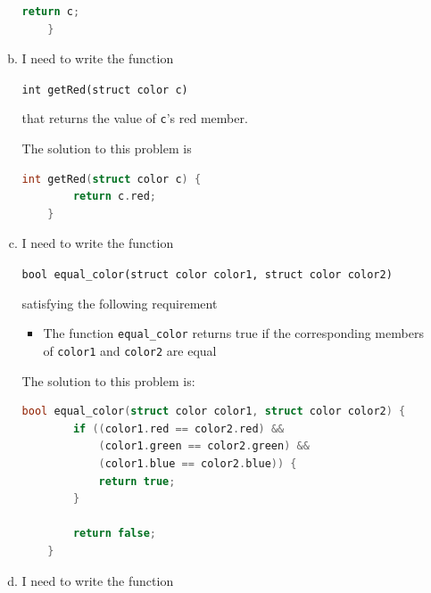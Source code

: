 \documentclass[12pt]{article}
\begin{document}
\begin{enumerate}[1.]
\begin{enumerate}[a)]
\begin{lstlisting}[language=c]
        return c;
    }
\end{lstlisting}

        \item

        I need to write the function

        \bigskip

        \texttt{int getRed(struct color c)}

        \bigskip

        that returns the value of \texttt{c}'s red member.

        \bigskip

        The solution to this problem is

\begin{lstlisting}[language=c]
    int getRed(struct color c) {
        return c.red;
    }
\end{lstlisting}

        \item

        I need to write the function

        \bigskip

        \texttt{bool equal\_color(struct color color1, struct color color2)}

        \bigskip

        satisfying the following requirement

        \begin{itemize}
            \item The function \texttt{equal\_color} returns true if the corresponding members of
            \texttt{color1} and \texttt{color2} are equal
        \end{itemize}

        \bigskip

        The solution to this problem is:

        \bigskip

\begin{lstlisting}[language=c]
    bool equal_color(struct color color1, struct color color2) {
        if ((color1.red == color2.red) &&
            (color1.green == color2.green) &&
            (color1.blue == color2.blue)) {
            return true;
        }

        return false;
    }
\end{lstlisting}

        \item

        I need to write the function


\end{enumerate}
\end{enumerate}
\end{document}

